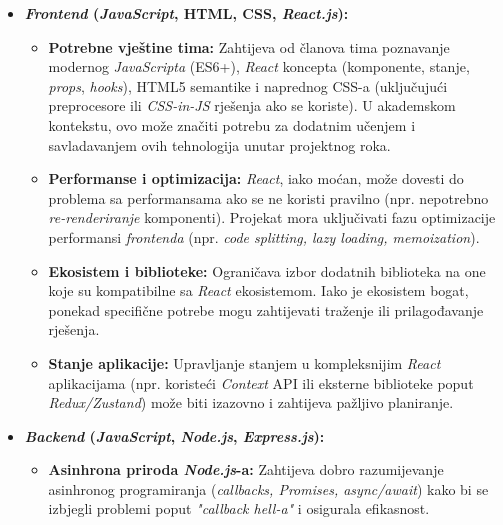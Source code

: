 \begin{itemize}
    
    \item \textbf{\textit{Frontend} (\textit{JavaScript}, HTML, CSS, \textit{React.js}):}

        \begin{itemize}
            \item \textbf{Potrebne vještine tima:} Zahtijeva od članova tima poznavanje modernog \textit{JavaScripta} (ES6+), \textit{React} koncepta (komponente, stanje, \textit{props}, \textit{hooks}), HTML5 semantike i naprednog CSS-a (uključujući preprocesore ili \textit{CSS-in-JS} rješenja ako se koriste). U akademskom kontekstu, ovo može značiti potrebu za dodatnim učenjem i savladavanjem ovih tehnologija unutar projektnog roka.
            
            \item \textbf{Performanse i optimizacija:} \textit{React}, iako moćan, može dovesti do problema sa performansama ako se ne koristi pravilno (npr. nepotrebno \textit{re-renderiranje} komponenti). Projekat mora uključivati fazu optimizacije performansi \textit{frontenda} (npr. \textit{code splitting, lazy loading, memoization}).
            
            \item \textbf{Ekosistem i biblioteke:} Ograničava izbor dodatnih biblioteka na one koje su kompatibilne sa \textit{React} ekosistemom. Iako je ekosistem bogat, ponekad specifične potrebe mogu zahtijevati traženje ili prilagođavanje rješenja.
            
            \item \textbf{Stanje aplikacije:} Upravljanje stanjem u kompleksnijim \textit{React} aplikacijama (npr. koristeći \textit{Context} API ili eksterne biblioteke poput \textit{Redux/Zustand}) može biti izazovno i zahtijeva pažljivo planiranje.
        
        \end{itemize}
        
    \item \textbf{\textit{Backend} (\textit{JavaScript}, \textit{Node.js}, \textit{Express.js}):}

        \begin{itemize}
            \item \textbf{Asinhrona priroda \textit{Node.js}-a:} Zahtijeva dobro razumijevanje asinhronog programiranja (\textit{callbacks, Promises, async/await}) kako bi se izbjegli problemi poput \textit{"callback hell-a"} i osigurala efikasnost.
            

\end{itemize}
\end{itemize}
